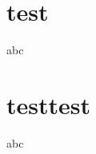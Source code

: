 \documentclass{beamer}
\begin{document}
\section{test}

\begin{frame}
    abc
\end{frame} 

\section{testtest}

\begin{frame}
    abc
\end{frame} 
\end{document}
